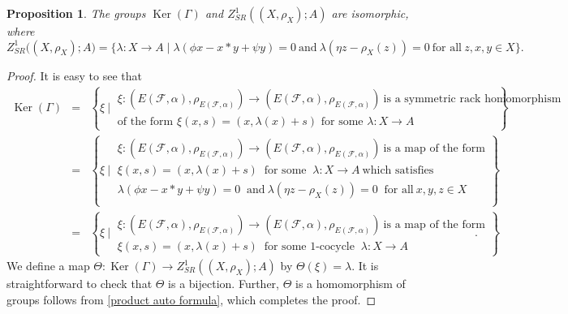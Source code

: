\documentclass[11pt,reqno]{amsart}
\newtheorem{proposition}[theorem]{Proposition}
\theoremstyle{definition}
\numberwithin{equation}{subsection}
\begin{document}
\begin{proposition}
The groups $\operatorname{Ker}(\Gamma)$ and $ Z_{SR}^{1}((X, \rho_{X}); A)$ are isomorphic, where 
	$$Z_{SR}^{1} \big((X, \rho_{X}); A\big)= \big\{\lambda: X \longrightarrow A \mid \lambda(\phi x-x * y+\psi y)=0~ \text{and}~\lambda(\eta z-\rho_{X}(z))=0~\textrm{for all}~ z,  x, y \in X \big\}.$$
\end{proposition} 

\begin{proof}
It is easy to see that
	\begin{eqnarray*}
		\operatorname{Ker}(\Gamma) &=& \left\{\xi ~\Big \vert ~
		\begin{array}{l}
			\xi: (E(\mathcal{F}, \alpha), \rho_{E(\mathcal{F}, \alpha)}) \longrightarrow (E(\mathcal{F}, \alpha), \rho_{E(\mathcal{F}, \alpha)})~ \text{is a symmetric rack homomorphism} \\
			\text{of the form } \xi(x, s) = (x,\lambda(x) + s) \text{ for some } \lambda: X \longrightarrow A
		\end{array} 
		\right\} \\[1em]
		&=& \left\{\xi ~\Big \vert ~ 
		\begin{array}{l}
			\xi: (E(\mathcal{F}, \alpha), \rho_{E(\mathcal{F}, \alpha)}) \longrightarrow (E(\mathcal{F}, \alpha), \rho_{E(\mathcal{F}, \alpha)}) ~\text{is a map of the form} \\
			\xi(x, s) = (x,\lambda(x) + s)~ \text{ for some } ~\lambda: X \longrightarrow A~ \text{which satisfies}~\\
 \lambda(\phi x - x*y + \psi y)=0~\text{ and}~ \lambda(\eta z - \rho_{X}(z))=0~  \text{ for all}~ x, y, z \in X\\
		\end{array} 
		\right\} \\[1em]
		&=& \left\{\xi ~\Big \vert ~ 
		\begin{array}{l}
			\xi: (E(\mathcal{F}, \alpha), \rho_{E(\mathcal{F}, \alpha)}) \longrightarrow (E(\mathcal{F}, \alpha), \rho_{E(\mathcal{F}, \alpha)})~ \text{is a map of the form} \\
			\xi(x, s) = (x,\lambda(x) + s) ~\text{ for some 1-cocycle } ~\lambda:X \to A
		\end{array} 
		\right\}.
	\end{eqnarray*}
We define a map $\Theta:\operatorname{Ker}(\Gamma) \rightarrow Z_{SR}^{1}((X, \rho_{X}); A)$ by $\Theta(\xi)=\lambda$. It is straightforward to check that $\Theta$ is a bijection. Further, $\Theta$ is a homomorphism of groups follows from \eqref{product auto formula}, which completes the proof.
\end{proof}
\end{document}
